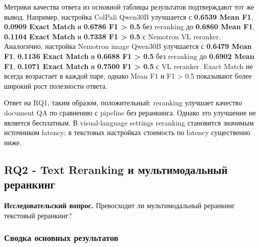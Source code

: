 \documentclass[conference]{IEEEtran}
\begin{document}
Метрики качества ответа из основной таблицы результатов подтверждают тот же вывод. Например, настройка ColPali Qwen30B улучшается с \textbf{0.6539 Mean F1}, \textbf{0.0909 Exact Match} и \textbf{0.6786 F1 > 0.5} без reranking до \textbf{0.6860 Mean F1}, \textbf{0.1104 Exact Match} и \textbf{0.7338 F1 > 0.5} с Nemotron VL reranker. Аналогично, настройка Nemotron image Qwen30B улучшается с \textbf{0.6479 Mean F1}, \textbf{0.1136 Exact Match} и \textbf{0.6688 F1 > 0.5} без reranking до \textbf{0.6902 Mean F1}, \textbf{0.1071 Exact Match} и \textbf{0.7500 F1 > 0.5} с VL reranker. Exact Match не всегда возрастает в каждой паре, однако Mean F1 и F1 > 0.5 показывают более широкий рост полезности ответа.

Ответ на RQ1, таким образом, положительный: reranking улучшает качество document QA по сравнению с pipeline без реранкинга. Однако это улучшение не является бесплатным. В visual-language settings reranking становится значимым источником latency; в текстовых настройках стоимость по latency существенно ниже.

\subsection{RQ2 - Text Reranking и мультимодальный реранкинг}

\textbf{Исследовательский вопрос.} Превосходит ли мультимодальный реранкинг текстовый реранкинг?

\subsubsection{Сводка основных результатов}

\begin{table}[t]
\caption{Таблица 4}
\centering
\scriptsize
{}
\end{table}
\end{document}
